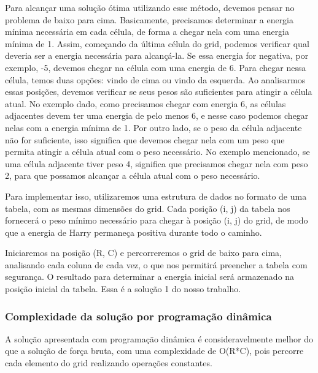 \documentclass[12pt]{article}
\begin{document}
            Para alcançar uma solução ótima utilizando esse método, devemos pensar no problema de 
            baixo para cima. Basicamente, precisamos determinar a energia mínima necessária em cada 
            célula, de forma a chegar nela com uma energia mínima de 1. Assim, começando da última 
            célula do grid, podemos verificar qual deveria ser a energia necessária para alcançá-la. 
            Se essa energia for negativa, por exemplo, -5, devemos chegar na célula com uma energia 
            de 6. Para chegar nessa célula, temos duas opções: vindo de cima ou vindo da esquerda. 
            Ao analisarmos essas posições, devemos verificar se seus pesos são suficientes para 
            atingir a célula atual. No exemplo dado, como precisamos chegar com energia 6, as células 
            adjacentes devem ter uma energia de pelo menos 6, e nesse caso podemos chegar nelas com 
            a energia mínima de 1. Por outro lado, se o peso da célula adjacente não for suficiente, 
            isso significa que devemos chegar nela com um peso que permita atingir a célula atual com 
            o peso necessário. No exemplo mencionado, se uma célula adjacente tiver peso 4, significa 
            que precisamos chegar nela com peso 2, para que possamos alcançar a célula atual com o 
            peso necessário.
            
            Para implementar isso, utilizaremos uma estrutura de dados no formato de uma tabela, 
            com as mesmas dimensões do grid. Cada posição (i, j) da tabela nos fornecerá o peso 
            mínimo necessário para chegar à posição (i, j) do grid, de modo que a energia de Harry 
            permaneça positiva durante todo o caminho.
            
            Iniciaremos na posição (R, C) e percorreremos o grid de baixo para cima, analisando cada 
            coluna de cada vez, o que nos permitirá preencher a tabela com segurança. O resultado para 
            determinar a energia inicial será armazenado na posição inicial da tabela. Essa é a solução 
            1 do nosso trabalho.

            \subsubsection{Complexidade da solução por programação dinâmica}
                A solução apresentada com programação dinâmica é consideravelmente melhor do que a 
                solução de força bruta, com uma complexidade de O(R*C), pois percorre cada elemento do 
                grid realizando operações constantes.
\end{document}
